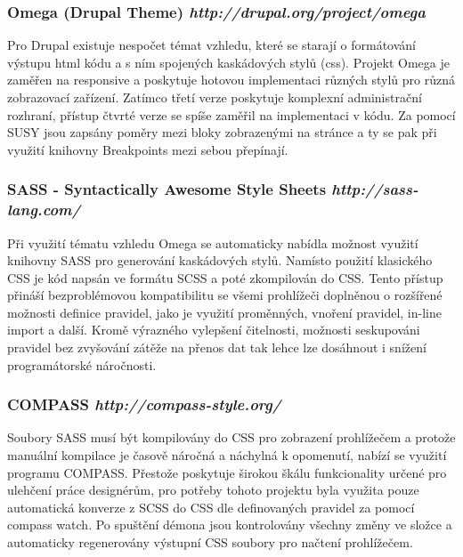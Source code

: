 \subsubsection*{Omega (Drupal Theme) \hfill \emph{http://drupal.org/project/omega}}
\label{subsec:omega}
Pro Drupal existuje nespočet témat vzhledu, které se starají o formátování výstupu html kódu a s ním spojených kaskádových stylů (css). Projekt Omega je zaměřen na \gls{responsive} a poskytuje hotovou implementaci různých stylů pro různá zobrazovací zařízení. Zatímco třetí verze poskytuje komplexní administrační rozhraní, přístup čtvrté verze se spíše zaměřil na implementaci v kódu. Za pomocí SUSY jsou zapsány poměry mezi bloky zobrazenými na stránce a ty se pak při využití knihovny Breakpoints\cite{website:breakpoints} mezi sebou přepínají.

\subsubsection*{SASS - Syntactically Awesome Style Sheets \hfill \emph{http://sass-lang.com/}}
\label{subsec:sass}
Při využití tématu vzhledu Omega se automaticky nabídla možnost využití knihovny SASS pro generování kaskádových stylů. Namísto použití klasického CSS je kód napsán ve formátu SCSS a poté zkompilován do CSS. Tento přístup přináší bezproblémovou kompatibilitu se všemi prohlížeči doplněnou o rozšířené možnosti definice pravidel, jako je využití proměnných, vnoření pravidel, in-line import a další. Kromě výrazného vylepšení čitelnosti, možnosti seskupováni pravidel bez zvyšování zátěže na přenos dat tak lehce lze dosáhnout i snížení programátorské náročnosti.

\subsubsection*{COMPASS \hfill \emph{http://compass-style.org/}}
\label{subsec:compass}
Soubory SASS musí být kompilovány do CSS pro zobrazení prohlížečem a protože manuální kompilace je časově náročná a náchylná k opomenutí, nabízí se využití programu COMPASS. Přestože poskytuje širokou škálu funkcionality určené pro ulehčení práce designérům, pro potřeby tohoto projektu byla využita pouze automatická konverze z SCSS do CSS dle definovaných pravidel za pomocí compass watch. Po spuštění démona jsou kontrolovány všechny změny ve složce a automaticky regenerovány výstupní CSS soubory pro načtení prohlížečem.

